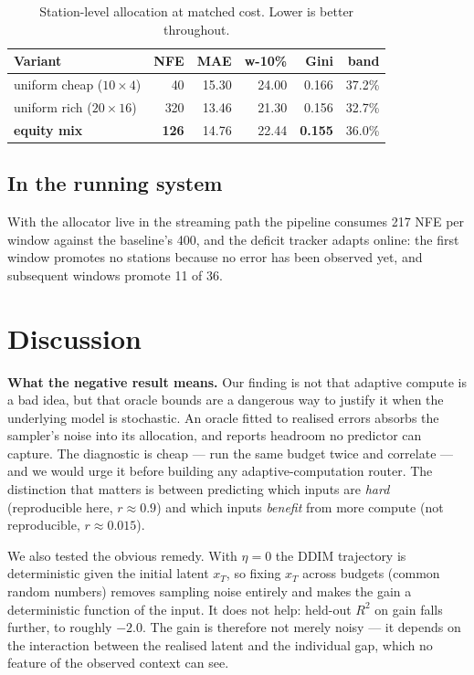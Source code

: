 \documentclass[conference]{IEEEtran}
\begin{document}
\begin{table}[t]
\caption{Station-level allocation at matched cost. Lower is better throughout.}
\label{tab:equity}
\centering\scriptsize
\setlength{\tabcolsep}{3.5pt}
\begin{tabular}{lrrrrr}
\toprule
Variant & NFE & MAE & w-10\% & Gini & band \\
\midrule
uniform cheap ($10{\times}4$) & 40 & 15.30 & 24.00 & 0.166 & 37.2\% \\
uniform rich ($20{\times}16$) & 320 & 13.46 & 21.30 & 0.156 & 32.7\% \\
\textbf{equity mix} & \textbf{126} & 14.76 & 22.44 & \textbf{0.155} & 36.0\% \\
\bottomrule
\end{tabular}
\end{table}

\subsection{In the running system}

With the allocator live in the streaming path the pipeline consumes 217 NFE per
window against the baseline's 400, and the deficit tracker adapts online:
the first window promotes no stations because no error has been observed yet,
and subsequent windows promote 11 of 36.

\section{Discussion}

\textbf{What the negative result means.} Our finding is not that adaptive
compute is a bad idea, but that oracle bounds are a dangerous way to justify it
when the underlying model is stochastic. An oracle fitted to realised errors
absorbs the sampler's noise into its allocation, and reports headroom no
predictor can capture. The diagnostic is cheap --- run the same budget twice
and correlate --- and we would urge it before building any adaptive-computation
router. The distinction that matters is between predicting which inputs are
\emph{hard} (reproducible here, $r\approx0.9$) and which inputs \emph{benefit}
from more compute (not reproducible, $r\approx0.015$).

We also tested the obvious remedy. With $\eta=0$ the DDIM trajectory is
deterministic given the initial latent $x_T$, so fixing $x_T$ across budgets
(common random numbers) removes sampling noise entirely and makes the gain a
deterministic function of the input. It does not help: held-out $R^2$ on gain
falls further, to roughly $-2.0$. The gain is therefore not merely noisy --- it
depends on the interaction between the realised latent and the individual gap,
which no feature of the observed context can see.
\end{document}
